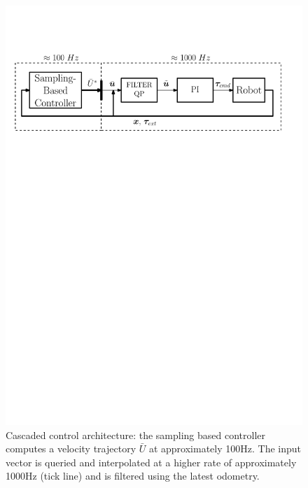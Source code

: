 \begin{figure}[t!]
\centering
\hspace*{-0.7cm}
\includegraphics[width=1.1\columnwidth]{figures/schemes/high_level_architecture.pdf}
\caption{Cascaded control architecture: the sampling based controller computes a velocity trajectory $\bar{U}$ at approximately 100Hz. The input vector is queried and interpolated at a higher rate of approximately 1000Hz (tick line) and is filtered using the latest odometry.} \label{fig:cascaded_architecture}
\end{figure}

